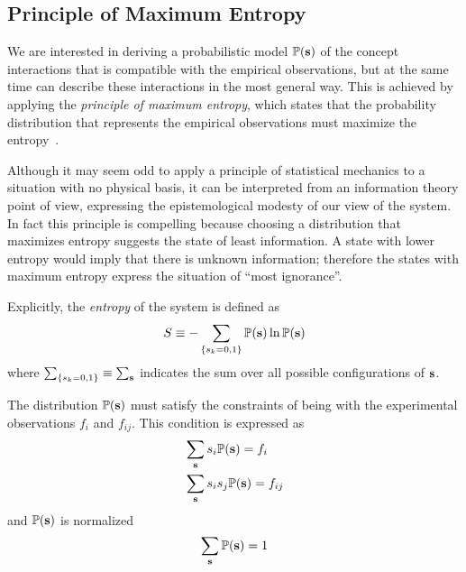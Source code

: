 \documentclass[a4paper,12pt,twoside]{article}
\def \be {\begin{equation}}
\def \ee {\end{equation}}
\def \bf {\textbf}
\def \P {{\mathbb{P}}}
\begin{document}
\subsection{Principle of Maximum Entropy}
We are interested in deriving a probabilistic model $\P(\bf s)$ of the concept interactions that is compatible with the empirical observations, but at the same time can describe these interactions in the most general way.
This is achieved by applying the {\em principle of maximum entropy}, which states that the probability distribution that represents the empirical observations must  maximize the entropy~\cite{jaynes1957}.

Although it may seem odd to apply a principle of statistical mechanics to a situation with no physical basis, it can be interpreted from an information theory point of view, expressing the epistemological modesty of our view of the system.
In fact this principle is compelling because choosing a distribution that maximizes entropy suggests the state of least information.
A state with lower entropy would imply that there is unknown information; therefore the states with maximum entropy express the situation of ``most ignorance''.

Explicitly, the {\em entropy} of the system is defined as
\be
  S \equiv - \sum_{\{s_k= 0,1\}} \P(\bf s) \ln \P(\bf s)
  \label{eq:sdef}
\ee
where $\sum_{\{s_k= 0,1\}} \equiv \sum_{\bf s}$ indicates the sum over all possible configurations of $\bf s$.

The distribution $\P(\bf s)$ must satisfy the constraints of being with the experimental observations $f_i$ and $f_{ij}$. This condition is expressed as
\begin{subequations}
  \begin{align}
    &\sum_{\bf s} s_i \P(\bf s) = f_i \\
    &\sum_{\bf s} s_i s_j \P(\bf s) = f_{ij} 
  \end{align}
  \label{eq:pconsistency}
\end{subequations}
and $\P(\bf s)$ is normalized
\be
  \sum_{\bf s} \P(\bf s) = 1
  \label{eq:pnorm}
\ee
\end{document}
